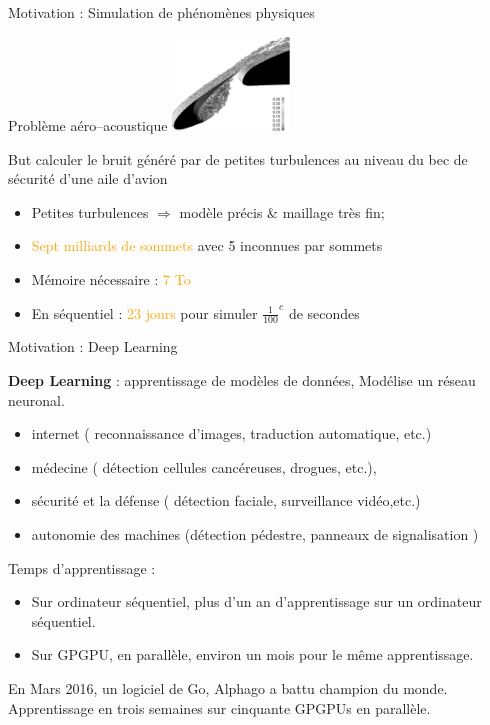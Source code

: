 \documentclass[handout]{beamer}
\begin{document}
\begin{frame}[fragile]{Motivation : Simulation de phénomènes physiques}

\begin{block}{Problème aéro--acoustique}
\center\includegraphics[height=2.5cm]{SlatWingTurb1}
\end{block}

\begin{block}{But}
calculer le bruit généré par de petites turbulences au niveau du bec de sécurité d'une aile d'avion

\begin{itemize}
\item  Petites turbulences $\Rightarrow$ modèle précis \& maillage très fin;
\item \textcolor{orange}{Sept milliards de sommets} avec 5 inconnues par sommets
\item Mémoire nécessaire : \textcolor{orange}{7 To}
\item En séquentiel : \textcolor{orange}{23 jours} pour simuler $\frac{1}{100}^{e}$ de secondes
\end{itemize}
\end{block}
\end{frame}

\begin{frame}[fragile]{Motivation : Deep Learning}

\textbf{Deep Learning} : apprentissage de modèles de données, Modélise un réseau neuronal.

\begin{itemize}
 \item internet ( reconnaissance d'images, traduction automatique, etc.)
 \item médecine ( détection cellules cancéreuses, drogues, etc.),
 \item sécurité et la défense ( détection faciale, surveillance vidéo,etc.)
 \item autonomie des machines (détection pédestre, panneaux de signalisation )
\end{itemize}

Temps d'apprentissage :
\begin{itemize}
\item Sur ordinateur séquentiel, plus d'un an d'apprentissage sur un ordinateur séquentiel.
\item Sur GPGPU, en parallèle, environ un mois pour le même apprentissage.
\end{itemize}

En Mars 2016, un logiciel de Go, Alphago a battu champion du monde. Apprentissage en trois semaines
sur cinquante GPGPUs en parallèle.

\end{frame}
\end{document}
